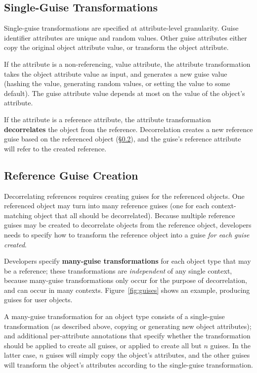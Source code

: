 \subsection{Single-Guise Transformations}
\label{sec:single_guise} 
Single-guise transformations are specified at attribute-level granularity. 
Guise identifier attributes are unique and random values. 
%
Other guise attributes either copy the original object attribute value, 
or transform the object attribute.  

If the attribute is a non-referencing, value attribute, the attribute transformation takes the
object attribute value as input, and generates a new guise value (\eg hashing the value, generating
random values, or setting the value to some default).  The guise attribute value depends at most on
the value of the object's attribute.

If the attribute is a reference attribute, the attribute transformation \textbf{decorrelates} the 
object from the reference. Decorrelation creates a new reference guise based on the referenced
object (\S\ref{sec:reference_guises}), and the guise's reference attribute will refer to the
created reference.

\subsection{Reference Guise Creation}
\label{sec:reference_guises} 
%
Decorrelating references requires creating guises for the referenced objects. One referenced object may turn into many
reference guises (one for each context-matching object that all should be decorrelated).  Because
multiple reference guises may be created to decorrelate objects from the reference object,
developers needs to specify how to transform the reference object into a guise \emph{for each guise
created}.

%
Developers specify \textbf{many-guise transformations} for each object type that may be a reference;
these transformations are \emph{independent} of any single context, because many-guise
transformations only occur for the purpose of decorrelation, and can occur in many contexts.
%
Figure~\ref{fig:guises} shows an example, producing guises for user objects.

A many-guise transformation for an object type consists of a single-guise transformation (as
described above, \ie copying or generating new object attributes); and additional per-attribute
annotations that specify whether the transformation should be applied to create all guises, or
applied to create all but $n$ guises. In the latter case, $n$ guises will simply copy the
object's attributes, and the other guises will transform the object's attributes according to the
single-guise transformation.

